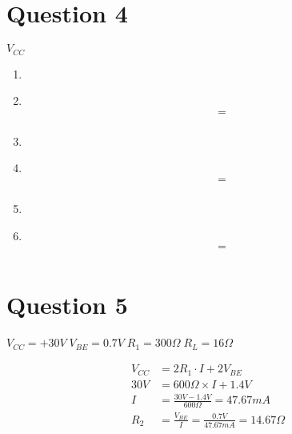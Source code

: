 \documentclass[11pt]{article}
\newcommand\Item[1][]{%
  \ifx\relax#1\relax  \item \else \item[#1] \fi
  \abovedisplayskip=0pt\abovedisplayshortskip=0pt~\vspace*{-\baselineskip}}
\begin{document}
\section*{Question 4}
  $V_{CC}$

  \begin{enumerate}[label=\roman*)]
    \Item %
      \begin{align*}
        &= \\
      \end{align*}
    \Item %
      \begin{align*}
        &= \\
      \end{align*}
    \Item %
      \begin{align*}
        &= \\
      \end{align*}
  \end{enumerate}
  

\newpage
\section*{Question 5}
  $V_{CC} = +30V \; V_{BE} = 0.7V \; R_{1} = 300\Omega \; R_L = 16\Omega$\
  
  \begin{align*}
    V_{CC} &= 2R_{1}{\cdot}I + 2V_{BE} \\
    30V &= 600\Omega \times I + 1.4V \\
    I &= \frac{30V-1.4V}{600\Omega} = 47.67mA \\
    R_{2} &= \frac{V_{BE}}{I} = \frac{0.7V}{47.67mA} = 14.67\Omega  \\
  \end{align*}
\end{document}
